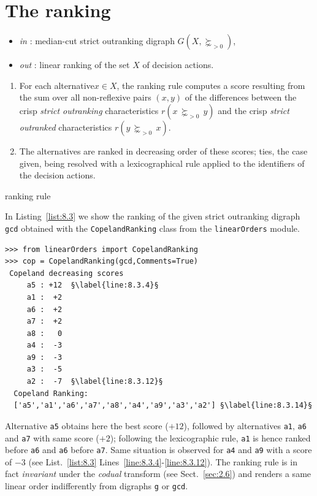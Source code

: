 \section{The \Copeland ranking}
\label{sec:8.2}

\begin{algorithm}[H]
    {\normalsize
\begin{itemize}
 \item [] \emph{in} : median-cut strict outranking digraph $G(X,\succnsim_{>0})$,
 \item [] \emph{out} : linear ranking of the set $X$ of decision actions.
\end{itemize}
  \begin{enumerate}
    \item For each alternative$x \in X$, the \Copeland ranking rule computes a score resulting from the sum over all non-reflexive pairs $(x,y)$  of the differences between the crisp \emph{strict outranking} characteristics $r(x\, \succnsim_{>0} \,y)$ and the crisp \emph{strict outranked} characteristics $r(y\, \succnsim_{>0} \, x)$.
    \item  The alternatives are ranked in decreasing order of these \Copeland scores; ties, the case given, being resolved with a lexicographical rule applied to the identifiers of the decision actions. 
    \end{enumerate}
    }
    \caption{\Copeland ranking rule \citep{COP-1951}}
\label{alg:8.1}
\end{algorithm}

In Listing~\vref{list:8.3} we show the ranking of the given strict outranking digraph \texttt{gcd} obtained with the \texttt{CopelandRanking} class from the \texttt{linearOrders} module. 
\begin{lstlisting}[caption={Computing a \Copeland Ranking},label=list:8.3]
>>> from linearOrders import CopelandRanking
>>> cop = CopelandRanking(gcd,Comments=True)
 Copeland decreasing scores
     a5 : +12  §\label{line:8.3.4}§
     a1 :  +2
     a6 :  +2
     a7 :  +2
     a8 :   0
     a4 :  -3
     a9 :  -3
     a3 :  -5
     a2 :  -7  §\label{line:8.3.12}§
  Copeland Ranking:
  ['a5','a1','a6','a7','a8','a4','a9','a3','a2'] §\label{line:8.3.14}§
\end{lstlisting}

Alternative \texttt{a5} obtains here the best \Copeland score ($+12$), followed by alternatives \texttt{a1}, \texttt{a6} and \texttt{a7} with same score ($+2$); following the lexicographic rule, \texttt{a1} is hence ranked before \texttt{a6} and \texttt{a6} before \texttt{a7}. Same situation is observed for \texttt{a4} and \texttt{a9} with a score of $-3$ (see List.~\vref{list:8.3} Lines~\ref{line:8.3.4}-\ref{line:8.3.12}). The \Copeland ranking rule is in fact \emph{invariant} under the \emph{codual} transform (see Sect.~\ref{sec:2.6}) and renders a same linear order indifferently from digraphs \texttt{g} or \texttt{gcd}.

